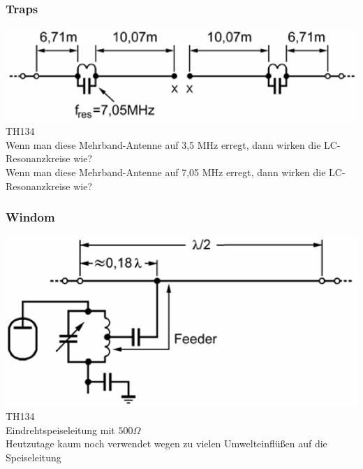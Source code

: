 \begin{frame}
    \frametitle{Traps}
    \begin{center}
        \includegraphics[width=1\textwidth]{a09/W3DZZ.png}
        \tiny \hyperlink{refs}{\cite{bna}} TH134 \\[1em] \large Wenn man diese Mehrband-Antenne auf 3,5 MHz erregt, dann wirken die LC-Resonanzkreise wie? \\[2em]
        Wenn man diese Mehrband-Antenne auf 7,05 MHz erregt, dann wirken die LC-Resonanzkreise wie?
	\end{center}
\end{frame}

\begin{frame}
    \frametitle{Windom}
    \begin{center}
        \includegraphics[width=1\textwidth]{a09/WINDOM_TH130.png}
        \tiny \hyperlink{refs}{\cite{bna}} TH134 \\[1em] \large Eindrehtspeiseleitung mit $500 \Omega$ \\[2em] Heutzutage kaum noch verwendet wegen zu vielen Umwelteinflüßen auf die Speiseleitung
	\end{center}
\end{frame}

